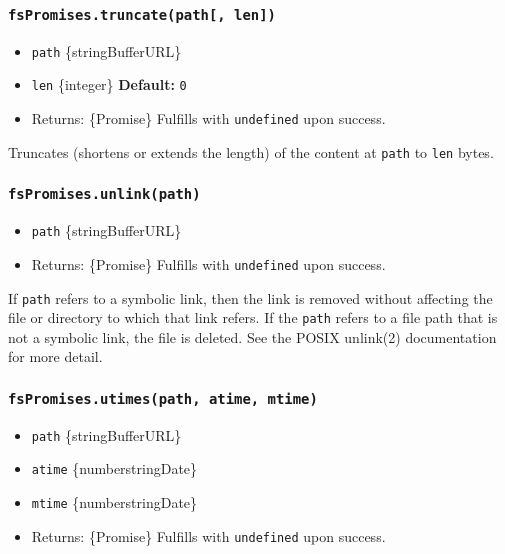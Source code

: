 \subsubsection{\texorpdfstring{\texttt{fsPromises.truncate(path{[},\ len{]})}}{fsPromises.truncate(path{[}, len{]})}}\label{fspromises.truncatepath-len}

\begin{itemize}
\tightlist
\item
  \texttt{path} \{string\textbar Buffer\textbar URL\}
\item
  \texttt{len} \{integer\} \textbf{Default:} \texttt{0}
\item
  Returns: \{Promise\} Fulfills with \texttt{undefined} upon success.
\end{itemize}

Truncates (shortens or extends the length) of the content at
\texttt{path} to \texttt{len} bytes.

\subsubsection{\texorpdfstring{\texttt{fsPromises.unlink(path)}}{fsPromises.unlink(path)}}\label{fspromises.unlinkpath}

\begin{itemize}
\tightlist
\item
  \texttt{path} \{string\textbar Buffer\textbar URL\}
\item
  Returns: \{Promise\} Fulfills with \texttt{undefined} upon success.
\end{itemize}

If \texttt{path} refers to a symbolic link, then the link is removed
without affecting the file or directory to which that link refers. If
the \texttt{path} refers to a file path that is not a symbolic link, the
file is deleted. See the POSIX unlink(2) documentation for more detail.

\subsubsection{\texorpdfstring{\texttt{fsPromises.utimes(path,\ atime,\ mtime)}}{fsPromises.utimes(path, atime, mtime)}}\label{fspromises.utimespath-atime-mtime}

\begin{itemize}
\tightlist
\item
  \texttt{path} \{string\textbar Buffer\textbar URL\}
\item
  \texttt{atime} \{number\textbar string\textbar Date\}
\item
  \texttt{mtime} \{number\textbar string\textbar Date\}
\item
  Returns: \{Promise\} Fulfills with \texttt{undefined} upon success.
\end{itemize}

